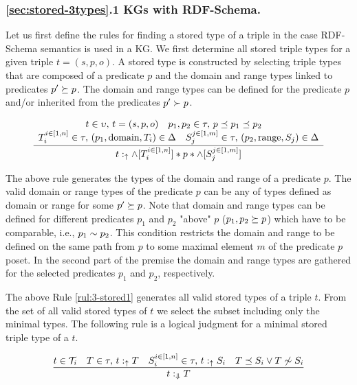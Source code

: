 \documentclass[runningheads]{llncs}
\newcommand{\uarr}{\uparrow}
\newcommand{\Darr}{\Downarrow}
\newcommand{\T}{{\cal T}}
\begin{document}
\subsubsection{\ref{sec:stored-3types}.1 KGs with RDF-Schema.}
Let us first define the rules for finding a stored type of a triple in
the case RDF-Schema semantics is used in a KG. We first determine all
stored triple types for a given triple $t=(s,p,o)$. A stored type is
constructed by selecting triple types that are composed of a predicate
$p$ and the domain and range types linked to predicates
$p'\succeq\/p$. The domain and range types can be defined for the
predicate $p$ and/or inherited from the predicates $p'\succ\/p$.

\begin{equation}
\label{rul:3-stored1}
\dfrac{\begin{array}{c}
       t\in\upsilon,\, t=(s,p,o)\quad p_1,p_2\in\tau,\, p\preceq\/p_1\preceq\/p_2\quad \\
       T_i^{i\in[1,n]}\in\tau,\, (p_1,\text{domain},T_i)\in\/\Delta\quad S_j^{j\in[1,m]}\in\tau,\, (p_2,\text{range},S_j)\in\Delta
       \end{array}}
      {t:_\uarr\/\land[T_i^{i\in[1,n]}]*p*\land[S_j^{j\in[1,m]}]}
\end{equation}

The above rule generates the types of the domain and range of a
predicate $p$. The valid domain or range types of the predicate $p$
can be any of types defined as domain or range for some
$p'\succeq\/p$. Note that domain and range types can be defined for
different predicates $p_1$ and $p_2$ "above" $p$ ($p_1,p_2\succeq\/p$)
which have to be comparable, i.e., $p_1\sim\/p_2$. This condition
restricts the domain and range to be defined on the same path from $p$
to some maximal element $m$ of the predicate $p$ poset. In the second
part of the premise the domain and range types are gathered for the
selected predicates $p_1$ and $p_2$, respectively.

The above Rule \ref{rul:3-stored1} generates all valid stored types of
a triple $t$. From the set of all valid stored types of $t$ we select
the subset including only the minimal types. The following rule is a
logical judgment for a minimal stored triple type of a $t$. 

\begin{equation}
\label{rul:min-stored-type}
\dfrac{t\in\T_i\quad T\in\tau,\, t:_\uarr\/T\quad\/S_i^{i\in[1,n]}\in\tau,\, t:_\uarr\/S_i\quad T\preceq\/S_i\lor\/T\not\sim\/S_i}
      {t:_{\Darr}\/T}
\end{equation}
\end{document}
